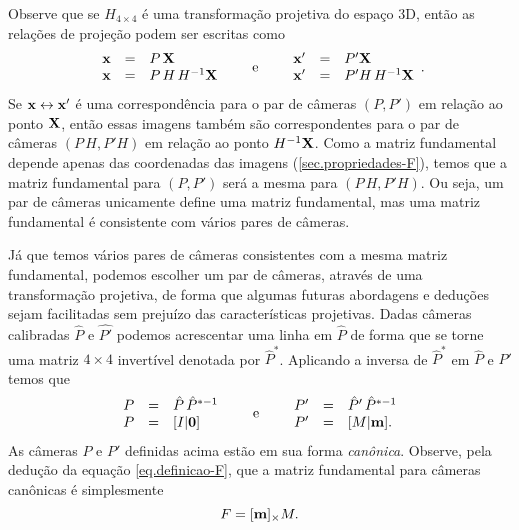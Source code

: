 Observe que se $H_{4\times4}$ é uma transformação projetiva do espaço 3D, então as relações de projeção podem ser escritas como
\begin{equation*}
\begin{array}{rcl}
\mathbf{x}&=&P\,\mathbf{X}\\
\mathbf{x}&=&P\,H\,H^{-1}\mathbf{X}
\end{array}\qquad\text{e}\qquad
\begin{array}{rcl}
\mathbf{x}'&=&P'\mathbf{X}\\
\mathbf{x}'&=&P'H\,H^{-1}\mathbf{X}
\end{array}.
\end{equation*} 
Se $\mathbf{x}\leftrightarrow\mathbf{x}'$ é uma correspondência para o par de câmeras $(P,P')$ em relação ao ponto $\mathbf{X}$, então essas imagens também são correspondentes para o par de câmeras $(P\,H,P'H)$ em relação ao ponto $H^{-1}\mathbf{X}$. Como a matriz fundamental depende apenas das coordenadas das imagens (\ref{sec.propriedades-F}), temos que a matriz fundamental para $(P,P')$ será a mesma para $(P\,H,P'H)$. Ou seja, um par de câmeras unicamente define uma matriz fundamental, mas uma matriz fundamental é consistente com vários pares de câmeras.

Já que temos vários pares de câmeras consistentes com a mesma matriz fundamental, podemos escolher um par de câmeras, através de uma transformação projetiva, de forma que algumas futuras abordagens e deduções sejam facilitadas sem prejuízo das características projetivas. Dadas câmeras calibradas $\hat{P}$ e $\hat{P'}$ podemos acrescentar uma linha em $\hat{P}$ de forma que se torne uma matriz $4\times4$ invertível denotada por $\hat{P}^*$. Aplicando a inversa de $\hat{P}^*$ em $\hat{P}$ e $\hat{P}'$ temos que
\begin{equation*}
\begin{array}{rcl}
P&=&\hat{P}\,\hat{P}^{*-1}\\
P&=&[I|{\bf 0}]
\end{array}\qquad\text{e}\qquad
\begin{array}{rcl}
P'&=&\hat{P}'\,\hat{P}^{*-1}\\
P'&=&[M|{\bf m}].
\end{array}
\end{equation*}
As câmeras $P$ e $P'$ definidas acima estão em sua forma {\it canônica}. Observe, pela dedução da equação \ref{eq.definicao-F}, que a matriz fundamental para câmeras canônicas é simplesmente 
\begin{equation*}
F=[{\bf m}]_\times M.
\end{equation*}


